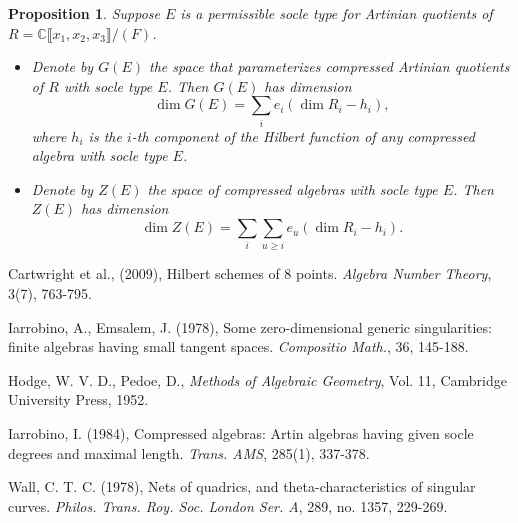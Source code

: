 \documentclass{amsart}[12pt]
\newtheorem{prop}[theorem]{Proposition}
\theoremstyle{definition}
\theoremstyle{remark}
\numberwithin{equation}{section}
\begin{document}
\begin{prop}
Suppose $E$ is a permissible socle type for Artinian quotients of $R = \mathbb{C}\llbracket x_1, x_2, x_3 \rrbracket/(F)$. 
\begin{itemize}
\item[1.]
Denote by $G(E)$ the space that parameterizes compressed Artinian quotients of $R$ with socle type $E$. Then $G(E)$ has dimension 
\[
\dim G(E) = \sum_i e_i(\dim R_i - h_i),
\]
where $h_i$ is the $i$-th component of the Hilbert function of any compressed algebra with socle type $E$.
\item[2.] Denote by $Z(E)$ the space of compressed algebras with socle type $E$. Then $Z(E)$ has dimension
\[
\dim Z(E) = \sum_i\sum_{u \geq i} e_u(\dim R_i - h_i).
\]
\end{itemize}
\end{prop}


\begin{thebibliography}{ShB91a}

Cartwright et al., (2009), Hilbert schemes of 8 points. {\em Algebra Number Theory}, 3(7), 763-795.

Iarrobino, A., Emsalem, J. (1978), Some zero-dimensional generic singularities: finite algebras having small tangent spaces. {\em Compositio Math.}, 36, 145-188.

Hodge, W. V. D., Pedoe, D., {\em Methods of Algebraic Geometry}, Vol. 11, Cambridge University Press, 1952.

Iarrobino, I. (1984), Compressed algebras: Artin algebras having given socle degrees and maximal length. {\em Trans. AMS}, 285(1), 337-378.

Wall, C. T. C. (1978), Nets of quadrics, and theta-characteristics of singular curves. {\em Philos. Trans. Roy. Soc. London Ser. A}, 289, no. 1357, 229-269.

\end{thebibliography}
\end{document}
